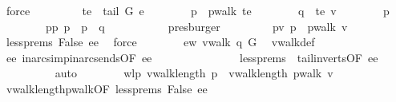 \begin{isabellebody}
\ force\ \isanewline
\ \ \ \ \ \ \isamarkupfalse%
\ {\isacharquery}te\ {\isacharequal}\ {\isachardoublequoteopen}tail\ G\ e{\isachardoublequoteclose}\isanewline
\ \ \ \ \ \ \isamarkupfalse%
\ {\isacharquery}p{\isacharprime}\ {\isacharequal}\ {\isachardoublequoteopen}pwalk\ {\isacharquery}te{\isachardoublequoteclose}\isanewline
\ \ \ \ \ \ \isamarkupfalse%
\ {\isacharquery}q\ {\isacharequal}\ {\isachardoublequoteopen}{\isacharbrackleft}{\isacharquery}te{\isacharcomma}\ v{\isacharbrackright}{\isachardoublequoteclose}\isanewline
\ \ \ \ \ \ \isamarkupfalse%
\ p\ \ \isanewline
\ \ \ \ \ \ \ \ pp{\isacharcolon}\ {\isachardoublequoteopen}p\ {\isacharequal}\ {\isacharquery}p{\isacharprime}\ {\isasymoplus}\ {\isacharquery}q{\isachardoublequoteclose}\ \isanewline
\ \ \ \ \ \ \ \ \isamarkupfalse%
\ presburger\ \isanewline
\ \ \ \ \ \ \isamarkupfalse%
\ pv{\isacharcolon}\ {\isachardoublequoteopen}p\ {\isacharequal}\ pwalk\ v{\isachardoublequoteclose}\ \isanewline
\ \ \ \ \ \ \ \ \isamarkupfalse%
\ less{\isachardot}prems\ False\ ee{\isacharparenleft}{}{\isacharparenright}\ \isamarkupfalse%
\ force\isanewline
\ \ \ \ \ \ \isamarkupfalse%
\ ew{\isacharcolon}\ {\isachardoublequoteopen}vwalk\ {\isacharquery}q\ G{\isachardoublequoteclose}\ \isamarkupfalse%
\ vwalk{\isacharunderscore}def\isanewline
\ \ \ \ \ \ \ \ \isamarkupfalse%
\ ee{\isacharparenleft}{}{\isacharparenright}\ in{\isacharunderscore}arcs{\isacharunderscore}imp{\isacharunderscore}in{\isacharunderscore}arcs{\isacharunderscore}ends{\isacharbrackleft}OF\ ee{\isacharparenleft}{}{\isacharparenright}{\isacharbrackright}\ \isanewline
\ \ \ \ \ \ \ \ \ \ \ \ \ \ less{\isachardot}prems\ \ tail{\isacharunderscore}in{\isacharunderscore}verts{\isacharbrackleft}OF\ ee{\isacharparenleft}{}{\isacharparenright}{\isacharbrackright}\ \isanewline
\ \ \ \ \ \ \ \ \isamarkupfalse%
\ auto\isanewline
\ \ \ \ \ \ \isamarkupfalse%
\ wlp{\isacharcolon}\ {\isachardoublequoteopen}vwalk{\isacharunderscore}length\ {\isacharquery}p{\isacharprime}\ {\isacharless}\ vwalk{\isacharunderscore}length\ {\isacharparenleft}pwalk\ v{\isacharparenright}{\isachardoublequoteclose}\isanewline
\ \ \ \ \ \ \ \ \isamarkupfalse%
\ vwalk{\isacharunderscore}length{\isacharunderscore}pwalk{\isacharbrackleft}OF\ less{\isachardot}prems\ False{\isacharbrackright}\ ee{\isacharparenleft}{}{\isacharparenright}\ \isanewline

\end{isabellebody}
